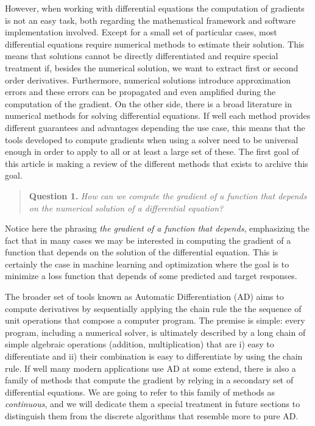 However, when working with differential equations the computation of gradients is not an easy task, both regarding the mathematical framework and software implementation involved. 
Except for a small set of particular cases, most differential equations require numerical methods to estimate their solution. 
This means that solutions cannot be directly differentiated and require special treatment if, besides the numerical solution, we want to extract first or second order derivatives. 
Furthermore, numerical solutions introduce approximation errors and these errors can be propagated and even amplified during the computation of the gradient. 
On the other side, there is a broad literature in numerical methods for solving differential equations. 
If well each method provides different guarantees and advantages depending the use case, this means that the tools developed to compute gradients when using a solver need to be universal enough in order to apply to all or at least a large set of these. 
The first goal of this article is making a review of the different methods that exists to archive this goal.
\begin{quote}
    \textbf{Question 1. }
    \textit{How can we compute the gradient of a function that depends on the numerical solution of a differential equation?}
\end{quote}
Notice here the phrasing \textit{the gradient of a function that depends}, emphasizing the fact that in many cases we may be interested in computing the gradient of a function that depends on the solution of the differential equation.
This is certainly the case in machine learning and optimization where the goal is to minimize a loss function that depends of some predicted and target responses. 

The broader set of tools known as Automatic Differentiation (AD) aims to compute derivatives by sequentially applying the chain rule the the sequence of unit operations that compose a computer program. 
The premise is simple: every program, including a numerical solver, is ultimately described by a long chain of simple algebraic operations (addition, multiplication) that are i) easy to differentiate and ii) their combination is easy to differentiate by using the chain rule. 
If well many modern applications use AD at some extend, there is also a family of methods that compute the gradient by relying in a secondary set of differential equations. 
We are going to refer to this family of methods as \textit{continuous}, and we will dedicate them a special treatment in future sections to distinguish them from the discrete algorithms that resemble more to pure AD. 

